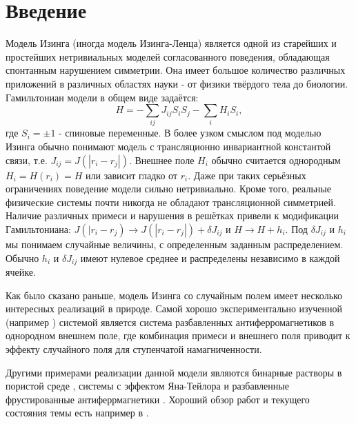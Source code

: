 \section{Введение}
	Модель Изинга (иногда модель Изинга-Ленца)  является одной из старейших и простейших нетривиальных моделей согласованного поведения, обладающая спонтанным нарушением симметрии. Она имеет большое количество различных приложений в различных областях науки  - от физики твёрдого тела до биологии. Гамильтониан модели в общем виде задаётся:
	\begin{equation}
		H = - \sum_{ij} J_{ij}	S_i S_j - \sum_{i} H_i S_i,
	\end{equation}
	где $S_i = \pm 1$ - спиновые переменные. В более узком смыслом под моделью Изинга обычно понимают модель с трансляционно инвариантной константой связи, т.е. $J_{ij} = J(|r_i - r_j|)$.
	 Внешнее поле $H_i$ обычно считается однородным $H_i = H(r_i) = H$ или зависит гладко от $r_i$.
	 Даже при таких серьёзных ограничениях поведение модели сильно нетривиально. Кроме того,  реальные физические системы почти никогда не обладают трансляционной симметрией.
	 Наличие различных примеси и нарушения в решётках привели к модификации Гамильтониана: $J(|r_i-r_j) \to J(|r_i-r_j|) + \delta J_{ij}$ и $H \to H + h_i$. Под $\delta J_{ij}$ и $h_i$  мы понимаем случайные величины, с определенным заданным распределением. Обычно $h_i$ и $\delta J_{ij}$ имеют нулевое среднее и распределены независимо в каждой ячейке.

	Как было сказано раньше, модель Изинга со случайным полем имеет несколько интересных реализаций в природе. Самой хорошо экспериментально изученной (например \cite{fishman}) системой является система разбавленных антиферромагнетиков  в однородном внешнем поле, где комбинация примеси и внешнего поля приводит к эффекту случайного поля для ступенчатой намагниченности.

	Другими примерами реализации данной модели являются бинарные растворы в пористой среде \cite{de1984liquid}, системы с эффектом Яна-Тейлора \cite{graham1987random} и разбавленные фрустированные антиферрмагнетики \cite{fernandez1988random}. Хороший обзор работ и текущего состояния темы есть например в \cite{nattermann1998theory}.

